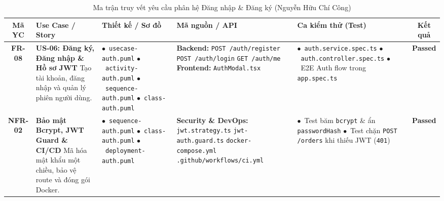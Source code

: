 \documentclass[a4paper]{article}
\begin{document}
\begin{table}[H]
\centering
\small
\begin{tabularx}{\textwidth}{|c|p{2.9cm}|p{3.0cm}|p{3.2cm}|X|c|}
\hline
\textbf{Mã YC} & \textbf{Use Case / Story} & \textbf{Thiết kế / Sơ đồ} & \textbf{Mã nguồn / API} & \textbf{Ca kiểm thử (Test)} & \textbf{Kết quả} \\ \hline
\textbf{FR-08} & 
\textbf{US-06: Đăng ký, Đăng nhập \& Hồ sơ JWT} \newline
Tạo tài khoản, đăng nhập và quản lý phiên người dùng. & 
$\bullet$~\nolinkurl{usecase-auth.puml} \newline
$\bullet$~\nolinkurl{activity-auth.puml} \newline
$\bullet$~\nolinkurl{sequence-auth.puml} \newline
$\bullet$~\nolinkurl{class-auth.puml} & 
\textbf{Backend:} \newline
\texttt{POST /auth/register} \newline
\texttt{POST /auth/login} \newline
\texttt{GET /auth/me} \newline
\textbf{Frontend:} \newline
\nolinkurl{AuthModal.tsx} & 
$\bullet$~\nolinkurl{auth.service.spec.ts} \newline
$\bullet$~\nolinkurl{auth.controller.spec.ts} \newline
$\bullet$~E2E Auth flow trong \nolinkurl{app.spec.ts} & 
\textbf{Passed} \\ \hline
\textbf{NFR-02} & 
\textbf{Bảo mật Bcrypt, JWT Guard \& CI/CD} \newline
Mã hóa mật khẩu một chiều, bảo vệ route và đóng gói Docker. & 
$\bullet$~\nolinkurl{sequence-auth.puml} \newline
$\bullet$~\nolinkurl{class-auth.puml} \newline
$\bullet$~\nolinkurl{deployment-auth.puml} & 
\textbf{Security \& DevOps:} \newline
\nolinkurl{jwt.strategy.ts} \newline
\nolinkurl{jwt-auth.guard.ts} \newline
\nolinkurl{docker-compose.yml} \newline
\nolinkurl{.github/workflows/ci.yml} & 
$\bullet$~Test băm \texttt{bcrypt} \& ẩn \texttt{passwordHash} \newline
$\bullet$~Test chặn \texttt{POST /orders} khi thiếu JWT (\texttt{401}) & 
\textbf{Passed} \\ \hline
\end{tabularx}
\caption{Ma trận truy vết yêu cầu phân hệ Đăng nhập \& Đăng ký (Nguyễn Hữu Chí Công)}
\label{tab:traceability_auth}
\end{table}
\end{document}
